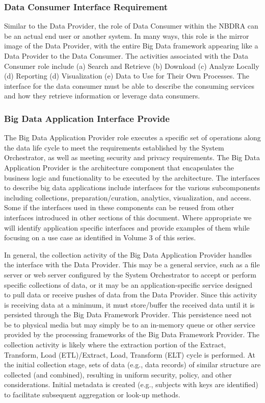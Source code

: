 \documentclass[9pt,twocolumn]{styles/osajnl}
\newcounter{subsubsubsection}[subsubsection]
\begin{document}
\subsubsection{Data Consumer Interface Requirement}

Similar to the Data Provider, the role of Data Consumer within the NBDRA can be an actual end user or another system. In many ways, this role is the mirror image of the Data Provider, with the entire Big Data framework appearing like a Data Provider to the Data Consumer. The activities associated with the Data Consumer role include (a) Search and Retrieve (b) Download (c) Analyze Locally (d) Reporting (d) Visualization (e) Data to Use for Their Own Processes. The interface for the data consumer must be able to describe the consuming services and how they retrieve information or leverage data consumers.

\subsubsection{Big Data Application Interface Provide}

The Big Data Application Provider role executes a specific set of operations along the data life cycle to meet the requirements established by the System Orchestrator, as well as meeting security and privacy requirements. The Big Data Application Provider is the architecture component that encapsulates the business logic and functionality to be executed by the architecture. 
The interfaces to describe big data applications include interfaces for the various subcomponents including collections, preparation/curation, analytics, visualization, and access. Some if the interfaces used in these components can be reused from other interfaces introduced in other sections of this document. Where appropriate we will identify application specific interfaces and provide examples of them while focusing on a use case as identified in Volume 3 of this series.


In general, the collection activity of the Big Data Application Provider handles the interface with the Data Provider. This may be a general service, such as a file server or web server configured by the System Orchestrator to accept or perform specific collections of data, or it may be an application-specific service designed to pull data or receive pushes of data from the Data Provider. Since this activity is receiving data at a minimum, it must store/buffer the received data until it is persisted through the Big Data Framework Provider. This persistence need not be to physical media but may simply be to an in-memory queue or other service provided by the processing frameworks of the Big Data Framework Provider. The collection activity is likely where the extraction portion of the Extract, Transform, Load (ETL)/Extract, Load, Transform (ELT) cycle is performed. At the initial collection stage, sets of data (e.g., data records) of similar structure are collected (and combined), resulting in uniform security, policy, and other considerations. Initial metadata is created (e.g., subjects with keys are identified) to facilitate subsequent aggregation or look-up methods.
\end{document}
